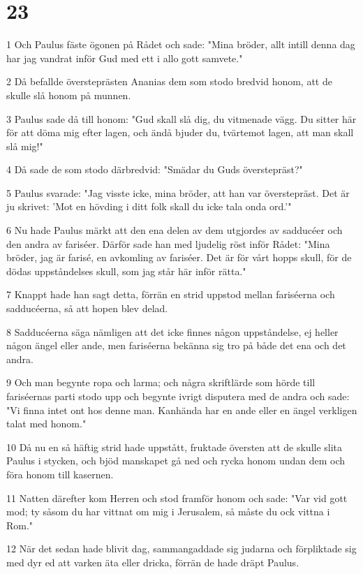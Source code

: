 \chapter{23}

\par 1 Och Paulus fäste ögonen på Rådet och sade: "Mina bröder, allt intill denna dag har jag vandrat inför Gud med ett i allo gott samvete."
\par 2 Då befallde översteprästen Ananias dem som stodo bredvid honom, att de skulle slå honom på munnen.
\par 3 Paulus sade då till honom: "Gud skall slå dig, du vitmenade vägg. Du sitter här för att döma mig efter lagen, och ändå bjuder du, tvärtemot lagen, att man skall slå mig!"
\par 4 Då sade de som stodo därbredvid: "Smädar du Guds överstepräst?"
\par 5 Paulus svarade: "Jag visste icke, mina bröder, att han var överstepräst. Det är ju skrivet: 'Mot en hövding i ditt folk skall du icke tala onda ord.'"
\par 6 Nu hade Paulus märkt att den ena delen av dem utgjordes av sadducéer och den andra av fariséer. Därför sade han med ljudelig röst inför Rådet: "Mina bröder, jag är farisé, en avkomling av fariséer. Det är för vårt hopps skull, för de dödas uppståndelses skull, som jag står här inför rätta."
\par 7 Knappt hade han sagt detta, förrän en strid uppstod mellan fariséerna och sadducéerna, så att hopen blev delad.
\par 8 Sadducéerna säga nämligen att det icke finnes någon uppståndelse, ej heller någon ängel eller ande, men fariséerna bekänna sig tro på både det ena och det andra.
\par 9 Och man begynte ropa och larma; och några skriftlärde som hörde till fariséernas parti stodo upp och begynte ivrigt disputera med de andra och sade: "Vi finna intet ont hos denne man. Kanhända har en ande eller en ängel verkligen talat med honom."
\par 10 Då nu en så häftig strid hade uppstått, fruktade översten att de skulle slita Paulus i stycken, och bjöd manskapet gå ned och rycka honom undan dem och föra honom till kasernen.
\par 11 Natten därefter kom Herren och stod framför honom och sade: "Var vid gott mod; ty såsom du har vittnat om mig i Jerusalem, så måste du ock vittna i Rom."
\par 12 När det sedan hade blivit dag, sammangaddade sig judarna och förpliktade sig med dyr ed att varken äta eller dricka, förrän de hade dräpt Paulus.
